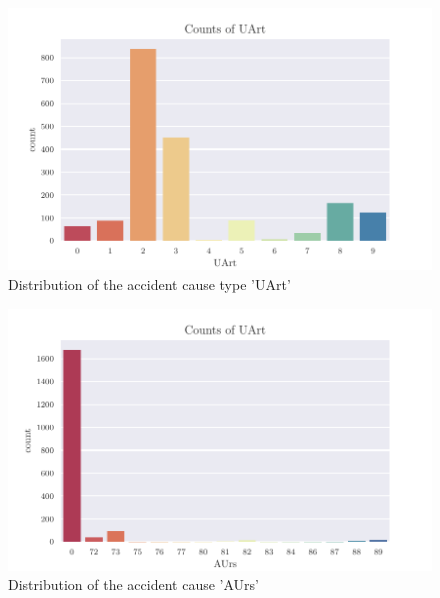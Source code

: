 \documentclass[a4paper,headsepline,footsepline,fontsize=11pt,BCOR=12mm,DIV=12]{report}
\begin{document}
\begin{appendices}
\begin{figure}[h]
	\centering
	\includegraphics[scale=1]{../CorrAnalysis/data/BAYSIS/02_matched/plots/baysis_matched_count_UArt}
	\caption{Distribution of the accident cause type 'UArt'}
	\label{img:appendix_baysis_matched_UArt}
\end{figure}

\begin{figure}[h]
	\centering
	\includegraphics[scale=1]{../CorrAnalysis/data/BAYSIS/02_matched/plots/baysis_matched_count_AUrs}
	\caption{Distribution of the accident cause 'AUrs'}
	\label{img:appendix_baysis_matched_AUrs}
\end{figure}


\end{appendices}
\end{document}
